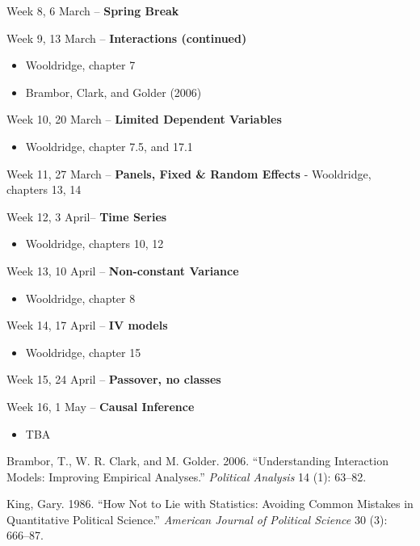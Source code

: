 \documentclass[
  letterpaper,
  DIV=11,
  numbers=noendperiod]{scrartcl}
\providecommand{\tightlist}{%
  \setlength{\itemsep}{0pt}\setlength{\parskip}{0pt}}\usepackage{longtable,booktabs,array}
\newlength{\cslhangindent}
\newlength{\cslentryspacingunit} %
\newenvironment{CSLReferences}[2] %
 {%
  \setlength{\parindent}{0pt}
  \ifodd #1
  \let\oldpar\par
  \def\par{\hangindent=\cslhangindent\oldpar}
  \fi
  \setlength{\parskip}{#2\cslentryspacingunit}
 }%
 {}
\begin{document}
Week 8, 6 March -- \textbf{Spring Break}

Week 9, 13 March -- \textbf{Interactions (continued)}

\begin{itemize}
\tightlist
\item
  Wooldridge, chapter 7
\item
  Brambor, Clark, and Golder (2006)
\end{itemize}

Week 10, 20 March -- \textbf{Limited Dependent Variables}

\begin{itemize}
\tightlist
\item
  Wooldridge, chapter 7.5, and 17.1
\end{itemize}

Week 11, 27 March -- \textbf{Panels, Fixed \& Random Effects} -
Wooldridge, chapters 13, 14

Week 12, 3 April-- \textbf{Time Series}

\begin{itemize}
\tightlist
\item
  Wooldridge, chapters 10, 12
\end{itemize}

Week 13, 10 April -- \textbf{Non-constant Variance}

\begin{itemize}
\tightlist
\item
  Wooldridge, chapter 8
\end{itemize}

Week 14, 17 April -- \textbf{IV models}

\begin{itemize}
\tightlist
\item
  Wooldridge, chapter 15
\end{itemize}

Week 15, 24 April -- \textbf{Passover, no classes}

Week 16, 1 May -- \textbf{Causal Inference}

\begin{itemize}
\tightlist
\item
  TBA
\end{itemize}

\hypertarget{refs}{}
\begin{CSLReferences}{1}{0}
\leavevmode{}%
Brambor, T., W. R. Clark, and M. Golder. 2006. {``Understanding
Interaction Models: Improving Empirical Analyses.''} \emph{Political
Analysis} 14 (1): 63--82.

\leavevmode{}%
King, Gary. 1986. {``How Not to Lie with Statistics: Avoiding Common
Mistakes in Quantitative Political Science.''} \emph{American Journal of
Political Science} 30 (3): 666--87.

\end{CSLReferences}
\end{document}
